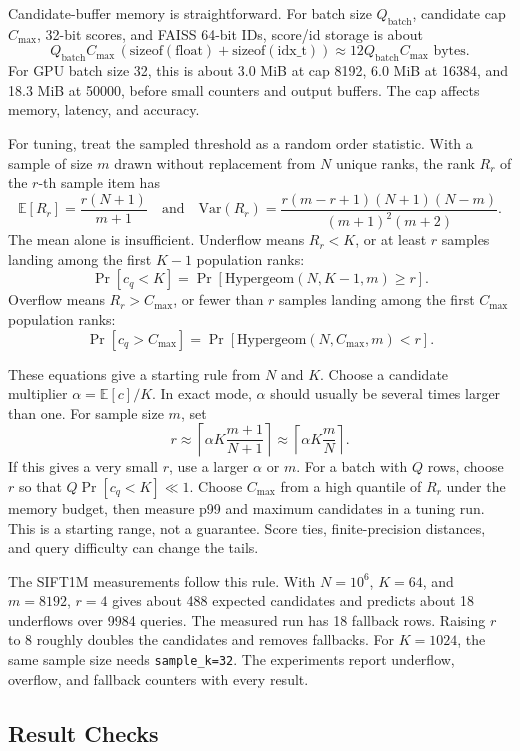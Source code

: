 Candidate-buffer memory is straightforward. For batch size $Q_{\mathrm{batch}}$,
candidate cap $C_{\max}$, 32-bit scores, and FAISS 64-bit IDs, score/id storage
is about
\[
  Q_{\mathrm{batch}} C_{\max}
  \,(\mathrm{sizeof(float)} + \mathrm{sizeof(idx\_t)})
  \approx 12 Q_{\mathrm{batch}} C_{\max} \text{ bytes}.
\]
For GPU batch size 32, this is about 3.0 MiB at cap 8192, 6.0 MiB at 16384, and
18.3 MiB at 50000, before small counters and output buffers. The cap affects
memory, latency, and accuracy.

For tuning, treat the sampled threshold as a random order statistic. With a
sample of size $m$ drawn without replacement from $N$ unique ranks, the rank
$R_r$ of the $r$-th sample item has
\[
  \mathbb{E}[R_r] = \frac{r(N+1)}{m+1}
  \quad\text{and}\quad
  \mathrm{Var}(R_r) =
  \frac{r(m-r+1)(N+1)(N-m)}{{(m+1)}^2(m+2)}.
\]
The mean alone is insufficient. Underflow means $R_r<K$, or at least $r$ samples landing
among the first $K-1$ population ranks:
\[
  \Pr[c_q<K] =
  \Pr\!\left[\mathrm{Hypergeom}(N,K-1,m) \geq r\right].
\]
Overflow means $R_r>C_{\max}$, or fewer than $r$ samples landing among the
first $C_{\max}$ population ranks:
\[
  \Pr[c_q>C_{\max}] =
  \Pr\!\left[\mathrm{Hypergeom}(N,C_{\max},m) < r\right].
\]

These equations give a starting rule from $N$ and $K$. Choose a candidate
multiplier $\alpha=\mathbb{E}[c]/K$. In exact mode, $\alpha$ should usually be
several times larger than one. For sample size $m$, set
\[
  r \approx \left\lceil \alpha K \frac{m+1}{N+1} \right\rceil
  \approx \left\lceil \alpha K \frac{m}{N} \right\rceil.
\]
If this gives a very small $r$, use a larger $\alpha$ or $m$. For a batch with
$Q$ rows, choose $r$ so that $Q\Pr[c_q<K]\ll 1$. Choose $C_{\max}$ from a high
quantile of $R_r$ under the memory budget, then measure p99 and maximum
candidates in a tuning run. This is a starting range, not a guarantee. Score
ties, finite-precision distances, and query difficulty can change the tails.

The SIFT1M measurements follow this rule. With $N=10^6$, $K=64$, and $m=8192$,
$r=4$ gives about 488 expected candidates and predicts about 18 underflows over
9984 queries. The measured run has 18 fallback rows. Raising $r$ to 8 roughly
doubles the candidates and removes fallbacks. For $K=1024$, the same sample
size needs \texttt{sample\_k=32}. The experiments report underflow, overflow,
and fallback counters with every result.

\subsection{Result Checks}

